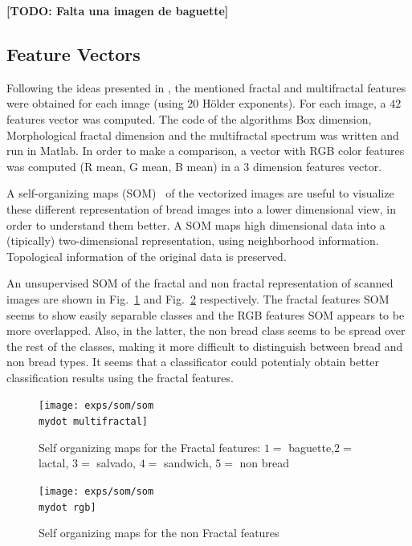 \documentclass[oneside,a4paper,english,links]{amca}
\newcommand{\mydot}{.}
\newcommand{\todo}[1]{\textbf{[TODO: #1]}}
\begin{document}
\todo{Falta una imagen de baguette}

\subsection{Feature Vectors}


Following the ideas presented in \cite{Gonzales2008}, the mentioned fractal and multifractal features were obtained for each image (using $20$ H\"older exponents). For each image, a $42$ features vector was computed. The code of the algorithms Box dimension, Morphological fractal dimension and the multifractal spectrum was written and run in Matlab. In order to make a comparison, a vector with RGB color features was computed (R mean, G mean, B mean) in a $3$ dimension features vector.

A self-organizing maps (SOM)~\cite{Kohonen2001} of the vectorized images are useful to visualize these different representation of bread images into a lower dimensional view, in order to understand them better. A SOM maps high dimensional data into a (tipically) two-dimensional representation, using neighborhood information. Topological information of the original data is preserved.  

An unsupervised SOM of the fractal and non fractal representation of scanned images are shown in Fig.~\ref{fig:somfractal} and Fig.~\ref{fig:somrgb} respectively. The fractal features SOM seems to show easily separable classes and the RGB features SOM appears to be more overlapped. Also, in the latter, the non bread class seems to be spread over the rest of the classes, making it more difficult to distinguish between bread and non bread types. It seems that a classificator could potentialy obtain better classification results using the fractal features. %

\begin{figure}[]
\centering
\texttt{[image: exps/som/som\\mydot multifractal]}
\caption{Self organizing maps for the Fractal features: $1 =$ baguette,$2 =$ lactal, $3 =$ salvado, $4 =$ sandwich, $5 =$ non bread }
\label{fig:somfractal}
\end{figure}

\begin{figure}[]
\centering
\texttt{[image: exps/som/som\\mydot rgb]}
\caption{Self organizing maps for the non Fractal features}
\label{fig:somrgb}
\end{figure}
\end{document}
